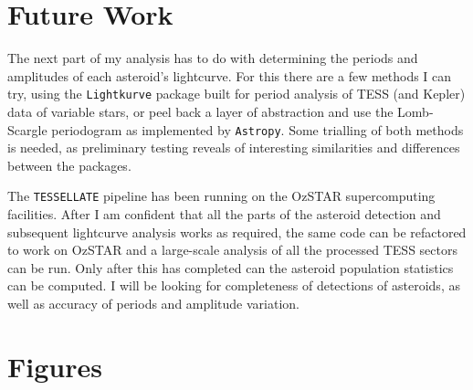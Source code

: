 \documentclass[12pt]{article}
\begin{document}
\section{Future Work}

The next part of my analysis has to do with determining the periods and amplitudes of each asteroid's lightcurve.
For this there are a few methods I can try, using the \texttt{Lightkurve} package built for period analysis of TESS (and Kepler) data of variable stars, or peel back a layer of abstraction and use the Lomb-Scargle periodogram as implemented by \texttt{Astropy}. 
Some trialling of both methods is needed, as preliminary testing reveals of interesting similarities and differences between the packages. 


The \texttt{TESSELLATE} pipeline has been running on the OzSTAR supercomputing facilities. 
After I am confident that all the parts of the asteroid detection and subsequent lightcurve analysis works as required, the same code can be refactored to work on OzSTAR and a large-scale analysis of all the processed TESS sectors can be run. 
Only after this has completed can the asteroid population statistics can be computed. 
I will be looking for completeness of detections of asteroids, as well as accuracy of periods and amplitude variation.


\section{Figures}



\def\bibfont{\tiny}


\end{document}
